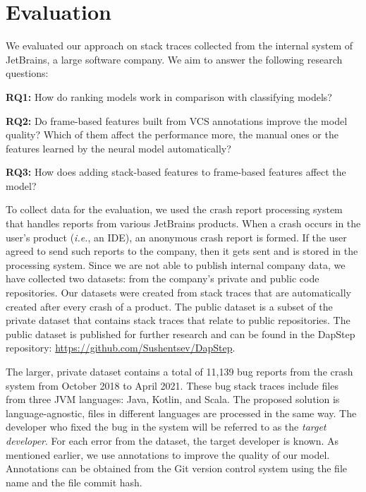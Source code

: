 \section{Evaluation}\label{sec:evaluation}


We evaluated our approach on stack traces collected from the internal system of JetBrains, a large software company. We aim to answer the following research questions:

\textbf{RQ1:} How do ranking models work in comparison with classifying models?

\textbf{RQ2:} Do frame-based features built from VCS annotations improve the model quality? Which of them affect the performance more, the manual ones or the features learned by the neural model automatically?

\textbf{RQ3:} How does adding stack-based features to frame-based features affect the model?



To collect data for the evaluation, we used the crash report processing system that handles reports from various JetBrains products. When a crash occurs in the user's product (\textit{i.e.}, an IDE), an anonymous crash report is formed. If the user agreed to send such reports to the company, then it gets sent and is stored in the processing system. Since we are not able to publish internal company data, we have collected two datasets: from the company's private and public code repositories. Our datasets were created from stack traces that are automatically created after every crash of a product. The public dataset is a subset of the private dataset that contains stack traces that relate to public repositories. The public dataset is published for further research and can be found in the DapStep repository: \url{https://github.com/Sushentsev/DapStep}.

The larger, private dataset contains a total of 11,139 bug reports from the crash system from October 2018 to April 2021. These bug stack traces include files from three JVM languages: Java, Kotlin, and Scala. The proposed solution is language-agnostic, files in different languages are processed in the same way. The developer who fixed the bug in the system will be referred to as the \textit{target developer}. For each error from the dataset, the target developer is known. As mentioned earlier, we use annotations to improve the quality of our model. Annotations can be obtained from the Git version control system using the file name and the file commit hash.

